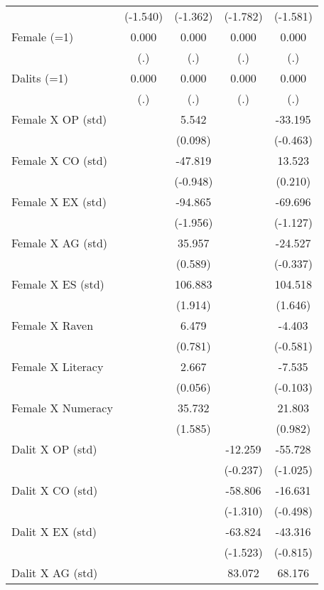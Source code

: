\begin{table}[htbp]
{\begin{tabular}{lcccc}
          & (-1.540) & (-1.362) & (-1.782) & (-1.581) \\
    Female (=1) & 0.000 & 0.000 & 0.000 & 0.000 \\
          & (.)   & (.)   & (.)   & (.) \\
    Dalits (=1) & 0.000 & 0.000 & 0.000 & 0.000 \\
          & (.)   & (.)   & (.)   & (.) \\
    Female X OP (std) &       & 5.542 &       & -33.195 \\
          &       & (0.098) &       & (-0.463) \\
    Female X CO (std) &       & -47.819 &       & 13.523 \\
          &       & (-0.948) &       & (0.210) \\
    Female X EX (std) &       & -94.865 &       & -69.696 \\
          &       & (-1.956) &       & (-1.127) \\
    Female X AG (std) &       & 35.957 &       & -24.527 \\
          &       & (0.589) &       & (-0.337) \\
    Female X ES (std) &       & 106.883 &       & 104.518 \\
          &       & (1.914) &       & (1.646) \\
    Female X Raven &       & 6.479 &       & -4.403 \\
          &       & (0.781) &       & (-0.581) \\
    Female X Literacy &       & 2.667 &       & -7.535 \\
          &       & (0.056) &       & (-0.103) \\
    Female X Numeracy &       & 35.732 &       & 21.803 \\
          &       & (1.585) &       & (0.982) \\
    Dalit X OP (std) &       &       & -12.259 & -55.728 \\
          &       &       & (-0.237) & (-1.025) \\
    Dalit X CO (std) &       &       & -58.806 & -16.631 \\
          &       &       & (-1.310) & (-0.498) \\
    Dalit X EX (std) &       &       & -63.824 & -43.316 \\
          &       &       & (-1.523) & (-0.815) \\
    Dalit X AG (std) &       &       & 83.072 & 68.176 \\

\end{tabular}}
\end{table}
